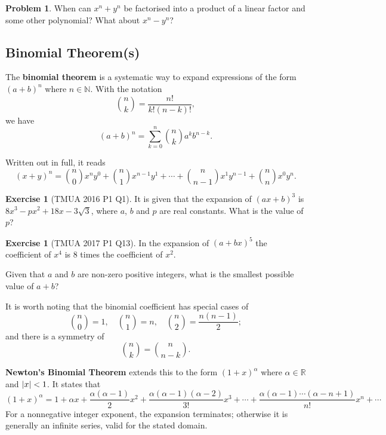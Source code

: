 \documentclass[11pt]{article}
\theoremstyle{definition}
\newtheorem{example}[theorem]{Exercise}
\newtheorem{problem}[theorem]{Problem}
\theoremstyle{remark}
\newcommand{\pqty}[1]{\left(#1\right)}
\DeclarePairedDelimiter{\abs}{\lvert}{\rvert}
\newcommand{\NN}{\mathbb{N}}
\newcommand{\RR}{\mathbb{R}}
\begin{document}
\begin{problem}\label{tmua-1-unit-003}
    When can \(x^n + y^n\) be factorised into a product of a linear factor and some other polynomial? What about \(x^n - y^n\)?
\end{problem}

\subsection{Binomial Theorem(s)}\label{tmua-1-subsection-002}
The \textbf{binomial theorem} is a systematic way to expand expressions of the form \(\pqty{a + b}^n\) where \(n \in \NN\). With the notation
\[
    \binom{n}{k} = \frac{n!}{k! \pqty{n - k}!},
\]
we have
\[
    \pqty{a + b}^n = \sum_{k = 0}^{n} \binom{n}{k} a^k b^{n - k}.
\]

Written out in full, it reads
\[
    \pqty{x + y}^n = \binom{n}{0} x^n y^0 + \binom{n}{1} x^{n - 1} y^1 + \cdots + \binom{n}{n - 1} x^1 y^{n - 1} + \binom{n}{n} x^0 y^n.
\]

\begin{example}[TMUA 2016 P1 Q1]\label{tmua-1-unit-004}
    It is given that the expansion of \(\pqty{ax + b}^3\) is \(8 x^3 - p x^2 + 18 x - 3 \sqrt{3}\), where \(a\), \(b\) and \(p\) are real constants. What is the value of \(p\)?
\end{example}

\begin{example}[TMUA 2017 P1 Q13]\label{tmua-1-unit-005}
    In the expansion of \(\pqty{a + bx}^5\) the coefficient of \(x^4\) is \(8\) times the coefficient of \(x^2\).

    Given that \(a\) and \(b\) are non-zero positive integers, what is the smallest possible value of \(a + b\)?
\end{example}

It is worth noting that the binomial coefficient has special cases of
\[
    \binom{n}{0} = 1, \quad \binom{n}{1} = n, \quad \binom{n}{2} = \frac{n \pqty{n - 1}}{2};
\]
and there is a symmetry of
\[
    \binom{n}{k} = \binom{n}{n - k}.
\]  

\textbf{Newton's Binomial Theorem} extends this to the form \(\pqty{1 + x}^{\alpha}\) where \(\alpha \in \RR\) and \(\abs{x} < 1\). It states that
\[
    \pqty{1 + x}^{\alpha} = 1 + \alpha x + \frac{\alpha \pqty{\alpha - 1}}{2} x^2 + \frac{\alpha \pqty{\alpha - 1} \pqty{\alpha - 2}}{3!} x^3 + \cdots + \frac{\alpha \pqty{\alpha - 1} \cdots \pqty{\alpha - n + 1}}{n!} x^n + \cdots
\]
For a nonnegative integer exponent, the expansion terminates; otherwise it is generally an infinite series, valid for the stated domain.
\end{document}
